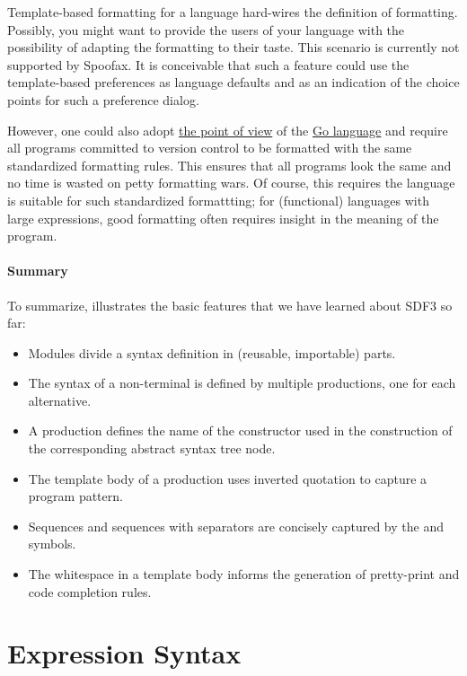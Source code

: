Template-based formatting for a language hard-wires the definition of
formatting. Possibly, you might want to provide the users of your language with
the possibility of adapting the formatting to their taste. This scenario is
currently not supported by Spoofax. It is conceivable that such a feature could
use the template-based preferences as language defaults and as an indication of
the choice points for such a preference dialog.

However, one could also adopt 
\href{http://blog.golang.org/go-fmt-your-code}{the point of view} 
of the \href{http://golang.org/}{Go language} and require all programs committed
to version control to be formatted with the same standardized formatting rules.
This ensures that all programs look the same and no time is wasted on petty
formatting wars. Of course, this requires the language is suitable for such
standardized formattting; for (functional) languages with large expressions,
good formatting often requires insight in the meaning of the program. 

\paragraph{Summary}

To summarize,  illustrates the basic features that 
we have learned about SDF3 so far:

\begin{itemize}
  \item Modules divide a syntax definition in (reusable, importable) parts.
  \item The syntax of a non-terminal is defined by multiple productions, one for
  each alternative.
  \item A production defines the name of the constructor used in the
  construction of the corresponding abstract syntax tree node.
  \item The template body of a production uses inverted quotation to capture a
  program pattern.
  \item Sequences and sequences with separators are concisely
  captured by the  and  symbols.
  \item The whitespace in a template body informs the generation of pretty-print
  and code completion rules.
\end{itemize}


\section{Expression Syntax}

